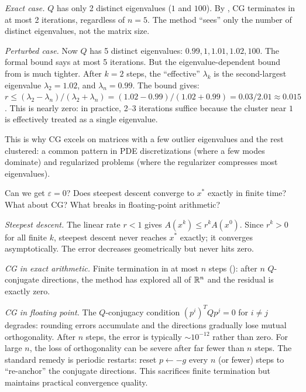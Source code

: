 \solution
\textit{Exact case.}
$Q$ has only 2 distinct eigenvalues ($1$ and $100$).
By , CG terminates in at most 2 iterations, regardless of $n = 5$.
The method ``sees'' only the number of distinct eigenvalues, not the matrix size.

\textit{Perturbed case.}
Now $Q$ has 5 distinct eigenvalues: $0.99, 1, 1.01, 1.02, 100$.
The formal bound says at most 5 iterations.
But the eigenvalue-dependent bound from  is much tighter.
After $k = 2$ steps, the ``effective'' $\lambda_k$ is the second-largest eigenvalue $\lambda_2 = 1.02$, and $\lambda_n = 0.99$.
The bound gives:
$r \leq (\lambda_2 - \lambda_n) / (\lambda_2 + \lambda_n) = (1.02 - 0.99)/(1.02 + 0.99) = 0.03/2.01 \approx 0.015$.
This is nearly zero: in practice, 2--3 iterations suffice because the cluster near $1$ is effectively treated as a single eigenvalue.

This is why CG excels on matrices with a few outlier eigenvalues and the rest clustered: a common pattern in PDE discretizations (where a few modes dominate) and regularized problems (where the regularizer compresses most eigenvalues).

\begin{exercise}{Can we get $\varepsilon = 0$?}\label{ex:asymptotic-convergence}
	Does steepest descent converge to $x^*$ exactly in finite time?
	What about CG?
	What breaks in floating-point arithmetic?
\end{exercise}

\solution
\textit{Steepest descent.}
The linear rate $r < 1$ gives $A(x^k) \leq r^k A(x^0)$.
Since $r^k > 0$ for all finite $k$, steepest descent never reaches $x^*$ exactly; it converges asymptotically.
The error decreases geometrically but never hits zero.

\textit{CG in exact arithmetic.}
Finite termination in at most $n$ steps (): after $n$ $Q$-conjugate directions, the method has explored all of $\mathbb{R}^n$ and the residual is exactly zero.

\textit{CG in floating point.}
The $Q$-conjugacy condition $(p^i)^T Q p^j = 0$ for $i \neq j$ degrades: rounding errors accumulate and the directions gradually lose mutual orthogonality.
After $n$ steps, the error is typically $\sim 10^{-12}$ rather than zero.
For large $n$, the loss of orthogonality can be severe after far fewer than $n$ steps.
The standard remedy is periodic restarts: reset $p \gets -g$ every $n$ (or fewer) steps to ``re-anchor'' the conjugate directions.
This sacrifices finite termination but maintains practical convergence quality.

